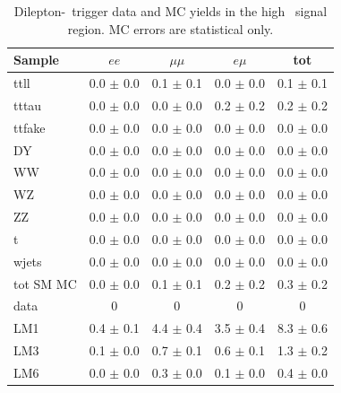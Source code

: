 \begin{table}[h!]
\begin{center}
\footnotesize
\caption{\label{tab:lowptsigyield2} Dilepton-\Ht\ trigger data and MC yields in the high \met\ signal region.
MC errors are statistical only.
}
\vspace{.25cm}
\begin{tabular}{l|cccc}
\hline
         Sample   &           $ee$   &       $\mu\mu$   &         $e\mu$   &            tot  \\
\hline
           ttll   &  0.0 $\pm$ 0.0   &  0.1 $\pm$ 0.1   &  0.0 $\pm$ 0.0   &  0.1 $\pm$ 0.1  \\
          tttau   &  0.0 $\pm$ 0.0   &  0.0 $\pm$ 0.0   &  0.2 $\pm$ 0.2   &  0.2 $\pm$ 0.2  \\
         ttfake   &  0.0 $\pm$ 0.0   &  0.0 $\pm$ 0.0   &  0.0 $\pm$ 0.0   &  0.0 $\pm$ 0.0  \\
             DY   &  0.0 $\pm$ 0.0   &  0.0 $\pm$ 0.0   &  0.0 $\pm$ 0.0   &  0.0 $\pm$ 0.0  \\
             WW   &  0.0 $\pm$ 0.0   &  0.0 $\pm$ 0.0   &  0.0 $\pm$ 0.0   &  0.0 $\pm$ 0.0  \\
             WZ   &  0.0 $\pm$ 0.0   &  0.0 $\pm$ 0.0   &  0.0 $\pm$ 0.0   &  0.0 $\pm$ 0.0  \\
             ZZ   &  0.0 $\pm$ 0.0   &  0.0 $\pm$ 0.0   &  0.0 $\pm$ 0.0   &  0.0 $\pm$ 0.0  \\
              t   &  0.0 $\pm$ 0.0   &  0.0 $\pm$ 0.0   &  0.0 $\pm$ 0.0   &  0.0 $\pm$ 0.0  \\
          wjets   &  0.0 $\pm$ 0.0   &  0.0 $\pm$ 0.0   &  0.0 $\pm$ 0.0   &  0.0 $\pm$ 0.0  \\
\hline
      tot SM MC   &  0.0 $\pm$ 0.0   &  0.1 $\pm$ 0.1   &  0.2 $\pm$ 0.2   &  0.3 $\pm$ 0.2  \\
\hline
           data   &              0   &              0   &              0   &              0  \\
\hline
            LM1   &  0.4 $\pm$ 0.1   &  4.4 $\pm$ 0.4   &  3.5 $\pm$ 0.4   &  8.3 $\pm$ 0.6  \\
            LM3   &  0.1 $\pm$ 0.0   &  0.7 $\pm$ 0.1   &  0.6 $\pm$ 0.1   &  1.3 $\pm$ 0.2  \\
            LM6   &  0.0 $\pm$ 0.0   &  0.3 $\pm$ 0.0   &  0.1 $\pm$ 0.0   &  0.4 $\pm$ 0.0  \\
\hline
\end{tabular}
\end{center}
\end{table}

